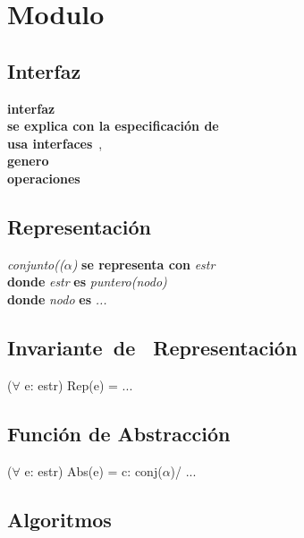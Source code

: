 \section*{Modulo }

\vspace{22pt}

\subsection*{Interfaz}
\textbf{interfaz}\ \\
\textbf{se explica con la especificaci\'on de}\ \\
\textbf{usa interfaces}\ , \\
\textbf{genero}\ \\
\textbf{operaciones}\\

\subsection*{Representaci\'on}
\textit{conjunto(($\alpha$)} \textbf{se representa con} \textit{estr}\\
\textbf{donde} \textit{estr} \textbf{es} \textit{puntero(nodo)}\\
\textbf{donde} \textit{nodo} \textbf{es} \textit{...}\\

\subsection*{Invariante\ de \ Representaci\'on}
\vspace{11pt}
($\forall$ e: estr) Rep(e) = ...
\vspace{33pt}

\subsection*{Funci\'on de Abstracci\'on}
\vspace{11pt}
($\forall$ e: estr) Abs(e) = c: conj($\alpha$)/ ...
\vspace{33pt}

\subsection*{Algoritmos}